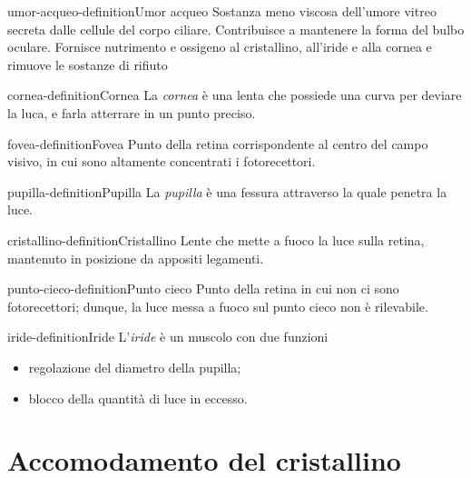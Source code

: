 \documentclass[preview]{standalone}
\begin{document}
\begin{snippetdefinition}{umor-acqueo-definition}{Umor acqueo}
    Sostanza meno viscosa dell'umore vitreo secreta dalle cellule del corpo ciliare. Contribuisce
    a mantenere la forma del bulbo oculare. Fornisce nutrimento e ossigeno al cristallino,
    all'iride e alla cornea e rimuove le sostanze di rifiuto
\end{snippetdefinition}

\begin{snippetdefinition}{cornea-definition}{Cornea}
    La \textit{cornea} è una lenta che possiede una curva per deviare la luca, e farla atterrare in un punto preciso.
\end{snippetdefinition}

\begin{snippetdefinition}{fovea-definition}{Fovea}
    Punto della retina corrispondente al centro del campo visivo, in cui sono altamente
    concentrati i fotorecettori.
\end{snippetdefinition}

\begin{snippetdefinition}{pupilla-definition}{Pupilla}
    La \textit{pupilla} è una fessura attraverso la quale penetra la luce. 
\end{snippetdefinition}

\begin{snippetdefinition}{cristallino-definition}{Cristallino}
    Lente che mette a fuoco la luce sulla retina, mantenuto in posizione da appositi legamenti.
\end{snippetdefinition}

\begin{snippetdefinition}{punto-cieco-definition}{Punto cieco}
    Punto della retina in cui non ci sono fotorecettori; dunque, la luce messa a fuoco sul punto
    cieco non è rilevabile.
\end{snippetdefinition}

\begin{snippetdefinition}{iride-definition}{Iride}
    L'\textit{iride} è un muscolo con due funzioni
    \begin{itemize}
        \item regolazione del diametro della pupilla;
        \item blocco della quantità di luce in eccesso.
    \end{itemize}
\end{snippetdefinition}

\section{Accomodamento del cristallino}
\end{document}
